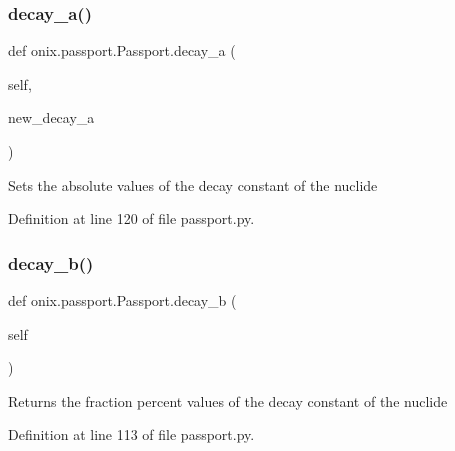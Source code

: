 \subsubsection{\texorpdfstring{decay\+\_\+a()}{decay\_a()}\hspace{0.1cm}{\footnotesize\ttfamily [2/2]}}
{\footnotesize\ttfamily def onix.\+passport.\+Passport.\+decay\+\_\+a (\begin{DoxyParamCaption}\item[{}]{self,  }\item[{}]{new\+\_\+decay\+\_\+a }\end{DoxyParamCaption})}

\begin{DoxyVerb}Sets the absolute values of the decay constant of the nuclide\end{DoxyVerb}
 

Definition at line 120 of file passport.\+py.

\mbox{\label{classonix_1_1passport_1_1Passport_abbd47a2a4eea4d19119d7f321b4133fa}} 
\subsubsection{\texorpdfstring{decay\+\_\+b()}{decay\_b()}\hspace{0.1cm}{\footnotesize\ttfamily [1/2]}}
{\footnotesize\ttfamily def onix.\+passport.\+Passport.\+decay\+\_\+b (\begin{DoxyParamCaption}\item[{}]{self }\end{DoxyParamCaption})}

\begin{DoxyVerb}Returns the fraction percent values of the decay constant of the nuclide\end{DoxyVerb}
 

Definition at line 113 of file passport.\+py.

\mbox{\label{classonix_1_1passport_1_1Passport_a8e24b6423404546fd7acc6e7620c3fbd}} 
